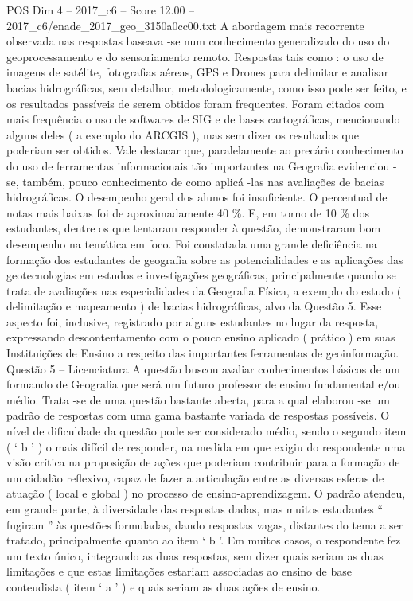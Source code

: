 \begin{textsample}{POS Dim 4 – 2017\_c6 – Score 12.00 – 2017\_c6/enade\_2017\_geo\_3150a0cc00.txt}
A abordagem mais recorrente observada nas respostas baseava -se num conhecimento generalizado do uso do geoprocessamento e do sensoriamento remoto.
Respostas tais como : o uso de imagens de satélite, fotografias aéreas, GPS e Drones para delimitar e analisar bacias hidrográficas, sem detalhar, metodologicamente, como isso pode ser feito, e os resultados passíveis de serem obtidos foram frequentes.
Foram citados com mais frequência o uso de softwares de SIG e de bases cartográficas, mencionando alguns deles ( a exemplo do ARCGIS ), mas sem dizer os resultados que poderiam ser obtidos.
Vale destacar que, paralelamente ao precário conhecimento do uso de ferramentas informacionais tão importantes na Geografia evidenciou -se, também, pouco conhecimento de como aplicá -las nas avaliações de bacias hidrográficas.
O desempenho geral dos alunos foi insuficiente.
O percentual de notas mais baixas foi de aproximadamente 40 \%.
E, em torno de 10 \% dos estudantes, dentre os que tentaram responder à questão, demonstraram bom desempenho na temática em foco.
Foi constatada uma grande deficiência na formação dos estudantes de geografia sobre as potencialidades e as aplicações das geotecnologias em estudos e investigações geográficas, principalmente quando se trata de avaliações nas especialidades da Geografia Física, a exemplo do estudo ( delimitação e mapeamento ) de bacias hidrográficas, alvo da Questão 5.
Esse aspecto foi, inclusive, registrado por alguns estudantes no lugar da resposta, expressando descontentamento com o pouco ensino aplicado ( prático ) em suas Instituições de Ensino a respeito das importantes ferramentas de geoinformação.
Questão 5 – Licenciatura A questão buscou avaliar conhecimentos básicos de um formando de Geografia que será um futuro professor de ensino fundamental e/ou médio.
Trata -se de uma questão bastante aberta, para a qual elaborou -se um padrão de respostas com uma gama bastante variada de respostas possíveis.
O nível de dificuldade da questão pode ser considerado médio, sendo o segundo item ( ‘ b ’ ) o mais difícil de responder, na medida em que exigiu do respondente uma visão crítica na proposição de ações que poderiam contribuir para a formação de um cidadão reflexivo, capaz de fazer a articulação entre as diversas esferas de atuação ( local e global ) no processo de ensino-aprendizagem.
O padrão atendeu, em grande parte, à diversidade das respostas dadas, mas muitos estudantes “ fugiram ” às questões formuladas, dando respostas vagas, distantes do tema a ser tratado, principalmente quanto ao item ‘ b ’.
Em muitos casos, o respondente fez um texto único, integrando as duas respostas, sem dizer quais seriam as duas limitações e que estas limitações estariam associadas ao ensino de base conteudista ( item ‘ a ’ ) e quais seriam as duas ações de ensino.

\end{textsample}
